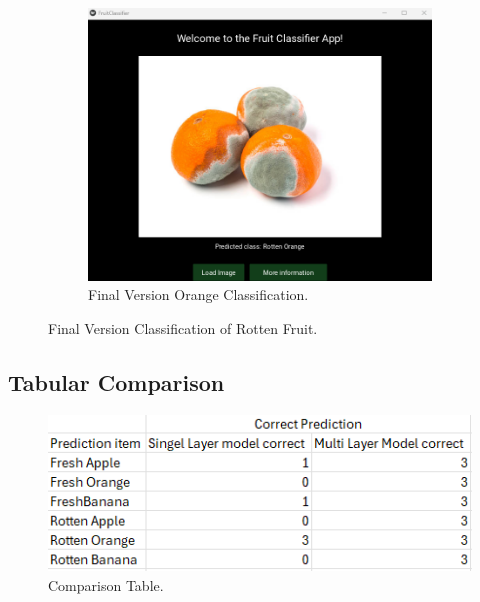\documentclass[conference]{IEEEtran}
\begin{document}
\begin{figure}[h]
\begin{subfigure}[b]{0.48\linewidth}
        \includegraphics[width=\linewidth]{Mlayer orageR3.png}
        \caption{Final Version Orange Classification.}
        \label{figFB}
    \end{subfigure}
    \caption{Final Version Classification of Rotten Fruit.}
    \label{FigMR}
\end{figure}
\clearpage

\subsection{Tabular Comparison}

\begin{figure}[h]
    \centering
    \includegraphics[width=\linewidth]{Ek wil huil.png}
    \caption{Comparison Table.}
    \label{figHuil}
\end{figure}
\end{document}
